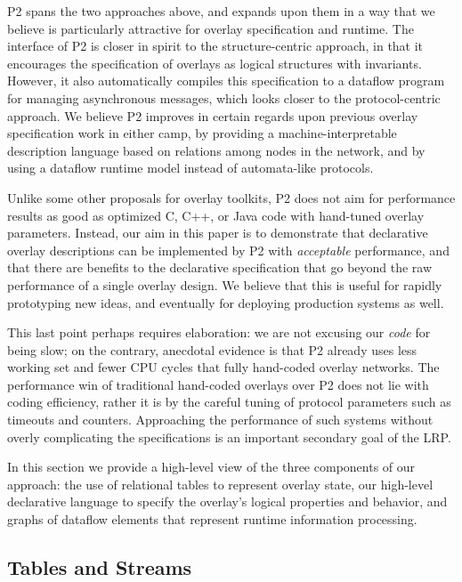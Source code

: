 \documentclass[twocolumn,10pt]{article}
\def\Sys{P2\xspace}
\begin{document}
\Sys spans the two approaches above, and expands upon them in a way
that we believe is particularly attractive for overlay specification
and runtime.  The interface of \Sys is closer in spirit to the
structure-centric approach, in that it encourages the specification of
overlays as logical structures with invariants.  However, it also
automatically compiles this specification to a dataflow program for
managing asynchronous messages, which looks closer to the
protocol-centric approach.  We believe \Sys improves in certain
regards upon previous overlay specification
work in either camp, by providing a machine-interpretable description
language based on relations among nodes in the network, and by using a
dataflow runtime model instead of automata-like protocols.

Unlike some other proposals for overlay toolkits, \Sys does not aim
for performance results as good as optimized C, C++, or Java code with
hand-tuned overlay parameters.  Instead, our aim in this paper is to
demonstrate that declarative overlay descriptions can be implemented
by \Sys with \emph{acceptable} performance, and that there are
benefits to the declarative specification that go beyond the raw
performance of a single overlay design.  We believe that this is
useful for rapidly prototyping new ideas, and eventually for deploying
production systems as well.

This last point perhaps requires elaboration: we are not excusing our
\emph{code} for being slow; on the contrary, anecdotal evidence is
that \Sys already uses less working set and fewer CPU cycles that
fully hand-coded overlay networks.   The performance win of 
traditional hand-coded overlays over \Sys does not lie with coding
efficiency, rather it is by the careful tuning of protocol parameters
such as timeouts and counters.  Approaching the performance of such
systems without overly complicating the specifications is an important
secondary goal of the LRP. 

In this section we provide a high-level view of the three components
of our approach: the use of relational tables to represent overlay
state, our high-level declarative language to specify the overlay's
logical properties and behavior, and graphs of dataflow elements that
represent runtime information processing. 

\subsection{Tables and Streams}
\label{sec:tablesandstreams}
\end{document}
